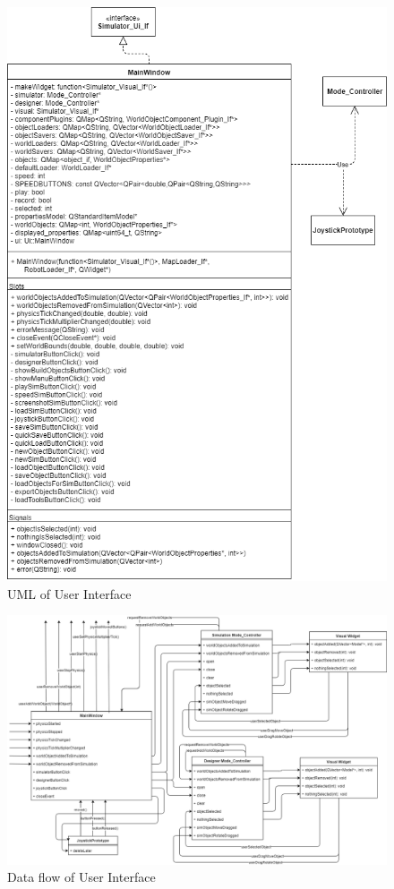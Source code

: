  \begin{figure}
 	\begin{center}
 	\includegraphics[scale=0.5]{./images_design/uml/MainWindow}
 	\caption{UML of User Interface\label{uml:mainwin}}
 	\end{center}
 \end{figure}

 \begin{figure}
 	\begin{center}
 	\includegraphics[width=\textwidth]{./images_design/uml/DataFlow_UI}
 	\caption{Data flow of User Interface\label{uml:dataflow_ui}}
 	\end{center}
 \end{figure} 
 
